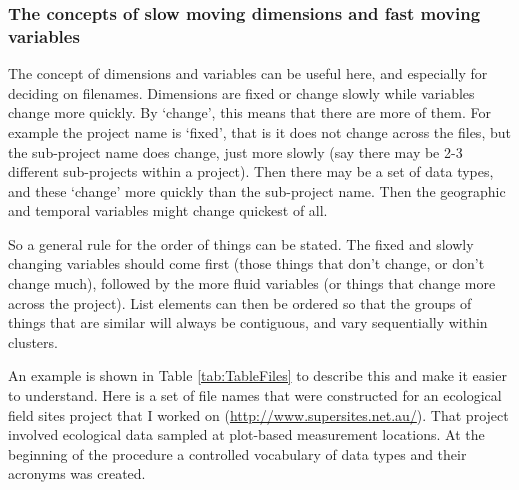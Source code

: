 \documentclass[11pt,a4paper]{article}
\begin{document}
\subsubsection{The concepts of slow moving dimensions and fast moving
variables}\label{the-concepts-of-slow-moving-dimensions-and-fast-moving-variables}

The concept of dimensions and variables can be useful here, and
especially for deciding on filenames. Dimensions are fixed or change
slowly while variables change more quickly. By `change', this means that
there are more of them. For example the project name is `fixed', that is
it does not change across the files, but the sub-project name does
change, just more slowly (say there may be 2-3 different sub-projects
within a project). Then there may be a set of data types, and these
`change' more quickly than the sub-project name. Then the geographic and
temporal variables might change quickest of all.

So a general rule for the order of things can be stated. The fixed and
slowly changing variables should come first (those things that don't
change, or don't change much), followed by the more fluid variables (or
things that change more across the project). List elements can then be
ordered so that the groups of things that are similar will always be
contiguous, and vary sequentially within clusters.

An example is shown in Table \ref{tab:TableFiles} to describe this and
make it easier to understand. Here is a set of file names that were
constructed for an ecological field sites project that I worked on
(\href{http://www.supersites.net.au/}{\url{http://www.supersites.net.au/}}).
That project involved ecological data sampled at plot-based measurement
locations. At the beginning of the procedure a controlled vocabulary of
data types and their acronyms was created.
\end{document}
